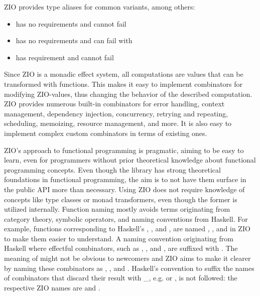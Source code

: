 ZIO provides type aliases for common variants, among others:
\begin{itemize}
    \item {} has no requirements and cannot fail
    \item {} has no requirements and can fail with 
    \item {} has requirement  and cannot fail
\end{itemize}

Since ZIO is a monadic effect system, all computations are values that can be transformed with functions. This makes it easy to implement combinators for modifying ZIO-values, thus changing the behavior of the described computation. ZIO provides numerous built-in combinators for error handling, context management, dependency injection, concurrency, retrying and repeating, scheduling, memoizing, resource management, and more. It is also easy to implement complex custom combinators in terms of existing ones.

ZIO's approach to functional programming is pragmatic, aiming to be easy to learn, even for programmers without prior theoretical knowledge about functional programming concepts. Even though the library has strong theoretical foundations in functional programming, the aim is to not have them surface in the public API more than necessary. Using ZIO does not require knowledge of concepts like type classes or monad transformers, even though the former is utilized internally. Function naming mostly avoids terms originating from category theory, symbolic operators, and naming conventions from Haskell. For example, functions corresponding to Haskell's , , and , are named , , and  in ZIO to make them easier to understand. A naming convention originating from Haskell where effectful combinators, such as , , and , are suffixed with . The meaning of  might not be obvious to newcomers and ZIO aims to make it clearer by naming these combinators as , , and .
Haskell's convention to suffix the names of combinators that discard their result with \_, e.g.  or , is not followed: the respective ZIO names are  and .

